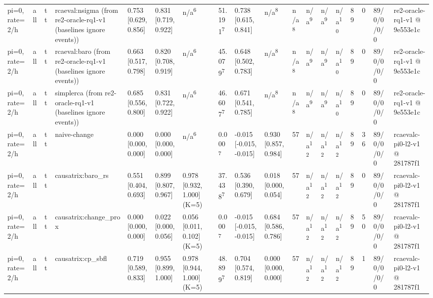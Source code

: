 \begin{table}[t]
\begin{tabular}{llllllllllllllllll}
pi=0, rate=2/h & all & tt & rcaeval:nsigma (from re2-oracle-rq1-v1 (baselines ignore events)) & 0.753 [0.629, 0.856] & 0.831 [0.719, 0.922] & n/a\textsuperscript{6} & 51.191\textsuperscript{7} & 0.738 [0.615, 0.841] & n/a\textsuperscript{8} & n/a\textsuperscript{8} & n/a\textsuperscript{9} & n/a\textsuperscript{9} & n/a\textsuperscript{10} & 89 & 0 & 89/0/0/0/0 & re2-oracle-rq1-v1 @ 9e553e1c \\
pi=0, rate=2/h & all & tt & rcaeval:baro (from re2-oracle-rq1-v1 (baselines ignore events)) & 0.663 [0.517, 0.798] & 0.820 [0.708, 0.919] & n/a\textsuperscript{6} & 45.079\textsuperscript{7} & 0.648 [0.502, 0.783] & n/a\textsuperscript{8} & n/a\textsuperscript{8} & n/a\textsuperscript{9} & n/a\textsuperscript{9} & n/a\textsuperscript{10} & 89 & 0 & 89/0/0/0/0 & re2-oracle-rq1-v1 @ 9e553e1c \\
pi=0, rate=2/h & all & tt & simplerca (from re2-oracle-rq1-v1 (baselines ignore events)) & 0.685 [0.556, 0.800] & 0.831 [0.722, 0.922] & n/a\textsuperscript{6} & 46.607\textsuperscript{7} & 0.671 [0.541, 0.785] & n/a\textsuperscript{8} & n/a\textsuperscript{8} & n/a\textsuperscript{9} & n/a\textsuperscript{9} & n/a\textsuperscript{10} & 89 & 0 & 89/0/0/0/0 & re2-oracle-rq1-v1 @ 9e553e1c \\
pi=0, rate=2/h & all & tt & naive-change & 0.000 [0.000, 0.000] & 0.000 [0.000, 0.000] & n/a\textsuperscript{6} & 0.000\textsuperscript{7} & -0.015 [-0.015, -0.015] & 0.930 [0.857, 0.984] & 57 & n/a\textsuperscript{12} & n/a\textsuperscript{12} & n/a\textsuperscript{12} & 89 & 36 & 89/0/0/0/0 & rcaevalc-pi0-l2-v1 @ 281787f1 \\
pi=0, rate=2/h & all & tt & causatrix:baro\_rs & 0.551 [0.404, 0.693] & 0.899 [0.807, 0.967] & 0.978 [0.932, 1.000] (K=5) & 37.438\textsuperscript{7} & 0.536 [0.390, 0.679] & 0.018 [0.000, 0.054] & 57 & n/a\textsuperscript{12} & n/a\textsuperscript{12} & n/a\textsuperscript{12} & 89 & 0 & 89/0/0/0/0 & rcaevalc-pi0-l2-v1 @ 281787f1 \\
pi=0, rate=2/h & all & tt & causatrix:change\_prox & 0.000 [0.000, 0.000] & 0.022 [0.000, 0.056] & 0.056 [0.011, 0.102] (K=5) & 0.000\textsuperscript{7} & -0.015 [-0.015, -0.015] & 0.684 [0.586, 0.786] & 57 & n/a\textsuperscript{12} & n/a\textsuperscript{12} & n/a\textsuperscript{12} & 89 & 50 & 89/0/0/0/0 & rcaevalc-pi0-l2-v1 @ 281787f1 \\
pi=0, rate=2/h & all & tt & causatrix:cp\_sbfl & 0.719 [0.589, 0.833] & 0.955 [0.899, 1.000] & 0.978 [0.944, 1.000] (K=5) & 48.899\textsuperscript{7} & 0.704 [0.574, 0.819] & 0.000 [0.000, 0.000] & 57 & n/a\textsuperscript{12} & n/a\textsuperscript{12} & n/a\textsuperscript{12} & 89 & 1 & 89/0/0/0/0 & rcaevalc-pi0-l2-v1 @ 281787f1 \\

\end{tabular}
\end{table}
